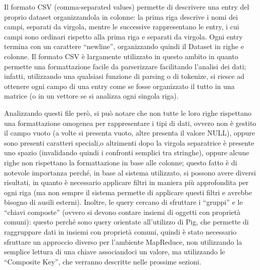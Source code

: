 \documentclass[11pt]{article} %
\begin{document}
Il formato CSV (comma-separated values) permette di descrivere una entry del proprio dataset organizzandola in colonne: la prima riga descrive i nomi dei campi, separati da virgola, mentre le successive rappresentano le entry, i cui campi sono ordinari rispetto alla prima riga e separati da virgola. Ogni entry termina con un carattere ``newline'', organizzando quindi il Dataset in righe e colonne. Il formato CSV è largamente utilizzato in questo ambito in quanto permette una formattazione facile da parserizzare facilitando l'analisi dei dati; infatti, utilizzando una qualsiasi funzione di parsing o di tokenize, si riesce ad ottenere ogni campo di una entry come se fosse organizzato il tutto in una matrice (o in un vettore se si analizza ogni singola riga).

Analizzando questi file però, si può notare che non tutte le loro righe rispettano una formattazione omogenea per rappresentare i tipi di dati, ovvero non è gestito il campo vuoto (a volte si presenta vuoto, altre presenta il valore NULL), oppure sono presenti caratteri speciali,o altrimenti dopo la virgola separatrice è presente uno spazio (invalidando quindi i confronti semplici tra stringhe), oppure alcune righe non rispettano la formattazione in base alle colonne; questo fatto è di notevole importanza perché, in base al sistema utilizzato, si possono avere diversi risultati, in quanto è necessario applicare filtri in maniera più approfondita per ogni riga (ma non sempre il sistema permette di applicare questi filtri e avrebbe bisogno di ausili esterni). Inoltre, le query cercano di sfruttare i ``gruppi'' e le ``chiavi composte'' (ovvero si devono contare insiemi di oggetti con proprietà comuni): questo perché sono query orientate all'utilizzo di Pig, che permette di raggruppare dati in insiemi con proprietà comuni, quindi è stato necessario sfruttare un approccio diverso per l'ambiente MapReduce, non utilizzando la semplice lettura di una chiave associandoci un valore, ma utilizzando le ``Composite Key'', che verranno descritte nelle prossime sezioni.
\end{document}
